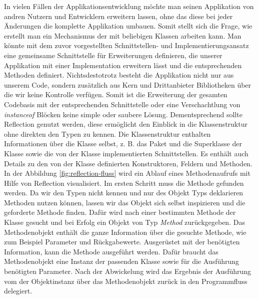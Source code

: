   \bigbreak In vielen Fällen der Applikationsentwicklung möchte man seinen Applikation von andren Nutzern und Entwicklern erweitern lassen, ohne das diese bei jeder Änderungen die komplette Applikation umbauen. 
  Somit stellt sich die Frage, wie erstellt man ein Mechanismus der mit beliebigen Klassen arbeiten kann.
  Man könnte mit dem zuvor vorgestellten Schnittstellen- und Implementierungsansatz eine gemeinsame Schnittstelle für Erweiterungen definieren, die unserer Applikation mit einer Implementation erweitern lässt und die entsprechenden Methoden definiert. 
  Nichtsdestotrotz besteht die Applikation nicht nur aus unserem Code, sondern zusätzlich aus Kern und Drittanbieter Bibliotheken über die wir keine Kontrolle verfügen.
  Somit ist die Erweiterung der gesamten Codebasis mit der entsprechenden Schnittstelle oder eine Verschachtlung von \textit{instanceof} Blöcken keine simple oder saubere Lösung. 
  \newline Dementsprechend sollte Reflection genutzt werden, diese ermöglicht den Einblick in die Klassenstruktur ohne direkten den Typen zu kennen. Die Klassenstruktur enthalten Informationen über die Klasse selbst, z. B. das Paket und die Superklasse der Klasse sowie die von der Klasse implementierten Schnittstellen. Es enthält auch Details zu den von der Klasse definierten Konstruktoren, Feldern und Methoden.
  \bigbreak In der Abbildung \ref{fig:reflection-fluss} wird ein Ablauf eines Methodenaufrufs mit Hilfe von Reflection visualisiert. Im ersten Schritt muss die Methode gefunden werden. 
  Da wir den Typen nicht kennen und nur des Objekt Typs deklarieren Methoden nutzen können, lassen wir das Objekt sich selbst inspizieren und die geforderte Methode finden. Dafür wird nach einer bestimmten Methode der Klasse gesucht und bei Erfolg ein Objekt von Typ \textit{Method} zurückgegeben. Das Methodenobjekt enthält die ganze Information über die gesuchte Methode, wie zum Beispiel Parameter und Rückgabewerte. Ausgerüstet mit der benötigten Information, kann die Methode ausgeführt werden. Dafür braucht das Methodenobjekt eine Instanz der passenden Klasse sowie für die Ausführung benötigten Parameter. Nach der Abwickelung wird das Ergebnis der Ausführung vom der Objektinstanz über das Methodenobjekt zurück in den Programmfluss delegiert. 
